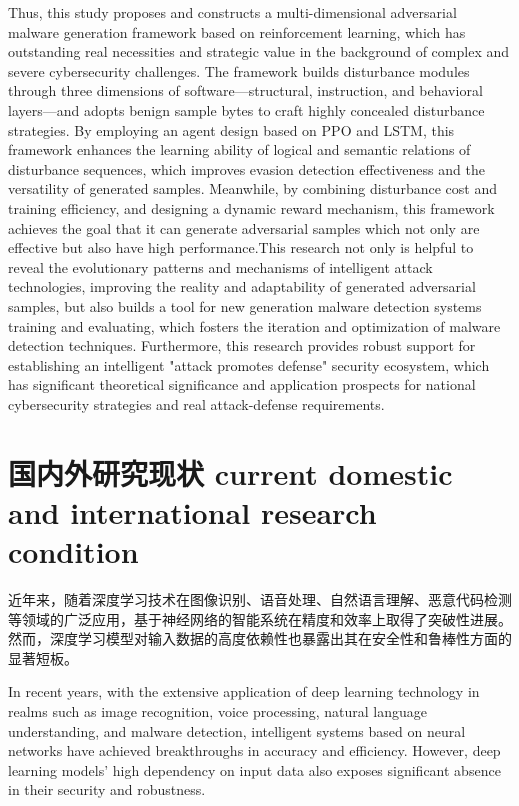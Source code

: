 Thus, this study proposes and constructs a multi-dimensional adversarial malware generation framework based on reinforcement learning, which has outstanding real necessities and strategic value in the background of complex and severe cybersecurity challenges. The framework builds disturbance modules through three dimensions of software—structural, instruction, and behavioral layers—and adopts benign sample bytes to craft highly concealed disturbance strategies. By employing an agent design based on PPO and LSTM, this framework enhances the learning ability of logical and semantic relations of disturbance sequences, which improves evasion detection effectiveness and the versatility of generated samples. Meanwhile, by combining disturbance cost and training efficiency, and designing a dynamic reward mechanism, this framework achieves the goal that it can generate adversarial samples which not only are effective but also have high performance.This research not only is helpful to reveal the evolutionary patterns and mechanisms of intelligent attack technologies, improving the reality and adaptability of generated adversarial samples, but also builds a tool for new generation malware detection systems training and evaluating, which fosters the iteration and optimization of malware detection techniques. Furthermore, this research provides robust support for establishing an intelligent "attack promotes defense" security ecosystem, which has significant theoretical significance and application prospects for national cybersecurity strategies and real attack-defense requirements.

\section{国内外研究现状 current domestic and international research condition }
近年来，随着深度学习技术在图像识别、语音处理、自然语言理解、恶意代码检测等领域的广泛应用\cite{meng2022adavit,yang2022torchaudio,weld2022survey,lee2023classification}，基于神经网络的智能系统在精度和效率上取得了突破性进展。然而，深度学习模型对输入数据的高度依赖性也暴露出其在安全性和鲁棒性方面的显著短板。

In recent years, with the extensive application of deep learning technology in realms such as image recognition\cite{meng2022adavit,yang2022torchaudio,weld2022survey,lee2023classification}, voice processing, natural language understanding, and malware detection, intelligent systems based on neural networks have achieved breakthroughs in accuracy and efficiency. However, deep learning models’ high dependency on input data also exposes significant absence in their security and robustness.

